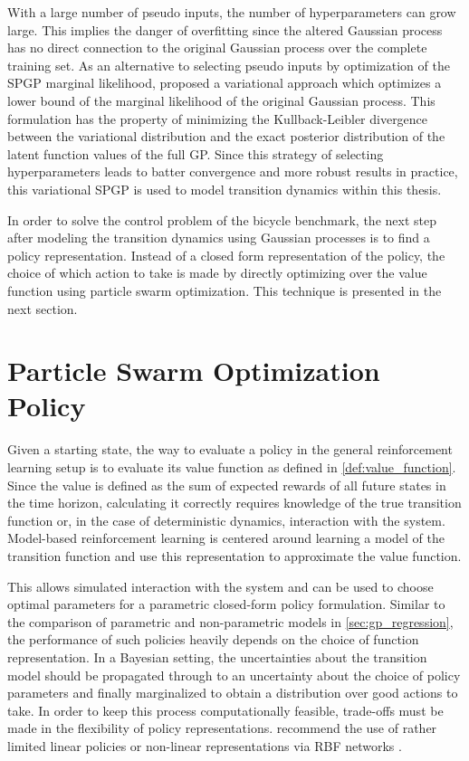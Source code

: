 With a large number of pseudo inputs, the number of hyperparameters can grow large.
This implies the danger of overfitting since the altered Gaussian process has no direct connection to the original Gaussian process over the complete training set.
As an alternative to selecting pseudo inputs by optimization of the SPGP marginal likelihood, \citeauthor{titsias_variational_2009} proposed a variational approach \cite{titsias_variational_2009} which optimizes a lower bound of the marginal likelihood of the original Gaussian process.
This formulation has the property of minimizing the Kullback-Leibler divergence between the variational distribution and the exact posterior distribution of the latent function values of the full GP.
Since this strategy of selecting hyperparameters leads to batter convergence and more robust results in practice, this variational SPGP is used to model transition dynamics within this thesis.

In order to solve the control problem of the bicycle benchmark, the next step after modeling the transition dynamics using Gaussian processes is to find a policy representation.
Instead of a closed form representation of the policy, the choice of which action to take is made by directly optimizing over the value function using particle swarm optimization.
This technique is presented in the next section.

\section{Particle Swarm Optimization Policy}
Given a starting state, the way to evaluate a policy in the general reinforcement learning setup is to evaluate its value function as defined in \cref{def:value_function}.
Since the value is defined as the sum of expected rewards of all future states in the time horizon, calculating it correctly requires knowledge of the true transition function or, in the case of deterministic dynamics, interaction with the system.
Model-based reinforcement learning is centered around learning a model of the transition function and use this representation to approximate the value function.

This allows simulated interaction with the system and can be used to choose optimal parameters for a parametric closed-form policy formulation.
Similar to the comparison of parametric and non-parametric models in \cref{sec:gp_regression}, the performance of such policies heavily depends on the choice of function representation.
In a Bayesian setting, the uncertainties about the transition model should be propagated through to an uncertainty about the choice of policy parameters and finally marginalized to obtain a distribution over good actions to take.
In order to keep this process computationally feasible, trade-offs must be made in the flexibility of policy representations.
\citeauthor{deisenroth_pilco:_2011} recommend the use of rather limited linear policies or non-linear representations via RBF networks \cite{deisenroth_pilco:_2011}.

